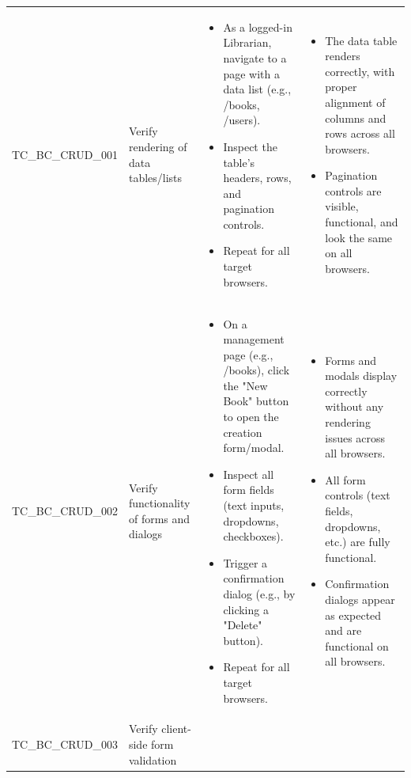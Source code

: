 \documentclass[10pt, a4paper]{report}
\begin{document}
\begin{longtable}{|>{\raggedright\arraybackslash}p{3cm}|>{\raggedright\arraybackslash}p{4.5cm}|>{\raggedright\arraybackslash}p{4.5cm}|>{\raggedright\arraybackslash}p{5.5cm}|}
\multicolumn{4}{|l|}{\textbf{Sub-Section: Core Functionality (CRUD Operations)}} \\ \hline
TC\_BC\_CRUD\_001 & Verify rendering of data tables/lists & 
    \begin{itemize}[noitemsep, topsep=0pt, partopsep=0pt, leftmargin=*]
        \item As a logged-in Librarian, navigate to a page with a data list (e.g., /books, /users).
        \item Inspect the table's headers, rows, and pagination controls.
        \item Repeat for all target browsers.
    \end{itemize} & 
    \begin{itemize}[noitemsep, topsep=0pt, partopsep=0pt, leftmargin=*]
        \item The data table renders correctly, with proper alignment of columns and rows across all browsers.
        \item Pagination controls are visible, functional, and look the same on all browsers.
    \end{itemize} \\ \hline
TC\_BC\_CRUD\_002 & Verify functionality of forms and dialogs & 
    \begin{itemize}[noitemsep, topsep=0pt, partopsep=0pt, leftmargin=*]
        \item On a management page (e.g., /books), click the "New Book" button to open the creation form/modal.
        \item Inspect all form fields (text inputs, dropdowns, checkboxes).
        \item Trigger a confirmation dialog (e.g., by clicking a "Delete" button).
        \item Repeat for all target browsers.
    \end{itemize} & 
    \begin{itemize}[noitemsep, topsep=0pt, partopsep=0pt, leftmargin=*]
        \item Forms and modals display correctly without any rendering issues across all browsers.
        \item All form controls (text fields, dropdowns, etc.) are fully functional.
        \item Confirmation dialogs appear as expected and are functional on all browsers.
    \end{itemize} \\ \hline
TC\_BC\_CRUD\_003 & Verify client-side form validation & 

\end{longtable}
\end{document}
